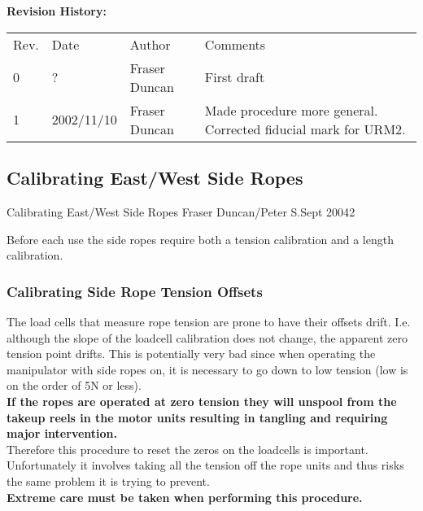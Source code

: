 {\small
~\\
~\\
\noindent
{\bf Revision History:}\\
\begin{tabular}{llll}
Rev. & Date & Author & Comments\\
0           & 
?  & 
Fraser Duncan &
\parbox[t]{3.0in}{
  First draft
}\\

1             & 
2002/11/10    & 
Fraser Duncan &
\parbox[t]{3.0in}{
  Made procedure more general.  Corrected fiducial mark for
  URM2.
}
\end{tabular}
}









\newpage
\subsection{Calibrating East/West Side Ropes}
\vspace*{0.25in}
\noindent
{}
             {Calibrating East/West Side Ropes}
             {Fraser Duncan/Peter S.}{Sept 2004}{2}

Before each use the side ropes require both a tension calibration
and a length calibration.

\subsubsection{Calibrating Side Rope Tension Offsets}
The load cells that measure rope tension are prone to have their
offsets drift.  I.e. although the slope of the loadcell calibration
does not change, the apparent zero tension point drifts.  This
is potentially very bad since when operating the manipulator with
side ropes on, it is necessary to go down to low tension (low is
on the order of 5N or less).\\
{\bf
  If the ropes are operated at zero tension they will unspool from
  the takeup reels in the motor units resulting in tangling and
  requiring major intervention.\\
}
Therefore this procedure to reset the zeros on the loadcells is
important.  Unfortunately it involves taking all the tension off
the rope units and thus risks the same problem it is trying to 
prevent.\\
{\bf
  Extreme care must be taken when performing this procedure. 
}

